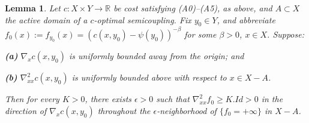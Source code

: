 \documentclass[12pt]{amsart}
\newtheorem{lem}{Lemma}
\theoremstyle{definition}
\theoremstyle{remark}
\newcommand{\bR}{\mathbb{R}}
\begin{document}


\begin{lem}\label{conc} 
Let $c: X\times Y \to \bR$ be cost satisfying (A0)--(A5), as above, and $A\subset X$ the active domain of a $c$-optimal semicoupling. Fix $y_0\in Y$, and abbreviate $f_0(x):=f_{y_0}(x)=(c(x,y_0)-\psi(y_0))^{-\beta}$ for some $\beta>0$, $x\in X$. 
Suppose:

\textbf{(a)} $\nabla_x c(x,y_0)$ is uniformly bounded away from the origin; and

\textbf{(b)}  $\nabla^2_{xx} c(x,y_0)$ is uniformly bounded above with respect to $x\in X-A$.

Then for every $K>0$, there exists $\epsilon>0$ such that $\nabla_{xx}^2 f_0\geq K.Id>0$ in the direction of $\nabla_x c(x,y_0)$ throughout the $\epsilon$-neighborhood of $\{f_0=+\infty\}$ in $X-A$.


\end{lem}
\end{document}
